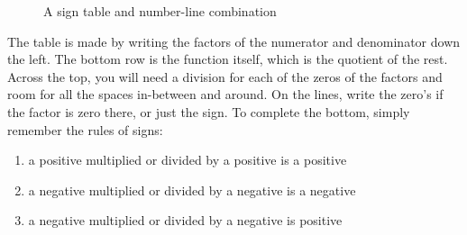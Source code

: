 \begin{figure}[h]
\begin{centering}
\caption{A sign table and number-line combination}
\end{centering}
\end{figure}

The table is made by writing the factors of the numerator and denominator down the
left.  The bottom row is the function itself, which is the quotient of the rest.  Across 
the top, you will need a division for each of the zeros of the factors and room
for all the spaces in-between and around.  On the lines, write the zero's if the factor
is zero there, or just the sign.  To complete the bottom, simply remember the
rules of  signs:

\begin{enumerate}
\item a positive multiplied or divided by a positive is a positive
\item a negative multiplied or divided by a negative is a negative
\item a negative multiplied or divided by a negative is positive
\end{enumerate}

